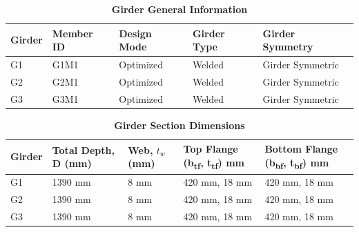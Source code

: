 \documentclass[12pt,a4paper]{report}
\numberwithin{table}{chapter}
\numberwithin{figure}{chapter}
\begin{document}
\newpage

\vspace{0.4em}
\noindent
            
\vspace{4pt}
\begin{longtable}{|L{2.2cm}|L{1.8cm}|p{3.8cm}|p{3.8cm}|p{3.8cm}|}
\caption{\textbf{Girder General Information}}
\\
\hline
\textbf{Girder} & \textbf{Member ID} & \textbf{Design Mode} & \textbf{Girder Type} & \textbf{Girder Symmetry} \\[6pt]
\hline
G1 & G1M1 & Optimized & Welded & Girder Symmetric \\[8pt]
\hline
G2 & G2M1 & Optimized & Welded & Girder Symmetric \\[8pt]
\hline
G3 & G3M1 & Optimized & Welded & Girder Symmetric \\[8pt]
\hline
\end{longtable}

\vspace{0.6em}

\vspace{4pt}
\begin{longtable}{|L{1.8cm}|L{2.3cm}|L{1.8cm}|p{4.8cm}|p{4.8cm}|}
\caption{\textbf{Girder Section Dimensions}}
\\
\hline
\textbf{Girder} & \textbf{Total Depth, D (mm)} & \textbf{Web, $t_w$ (mm)} & \textbf{Top Flange (b\textsubscript{tf}, t\textsubscript{tf}) mm} & \textbf{Bottom Flange (b\textsubscript{bf}, t\textsubscript{bf}) mm} \\[6pt]
\hline
G1 & 1390 mm & 8 mm & 420 mm, 18 mm & 420 mm, 18 mm \\[8pt]
\hline
G2 & 1390 mm & 8 mm & 420 mm, 18 mm & 420 mm, 18 mm \\[8pt]
\hline
G3 & 1390 mm & 8 mm & 420 mm, 18 mm & 420 mm, 18 mm \\[8pt]
\hline
\end{longtable}

\vspace{0.6em}
\end{document}
